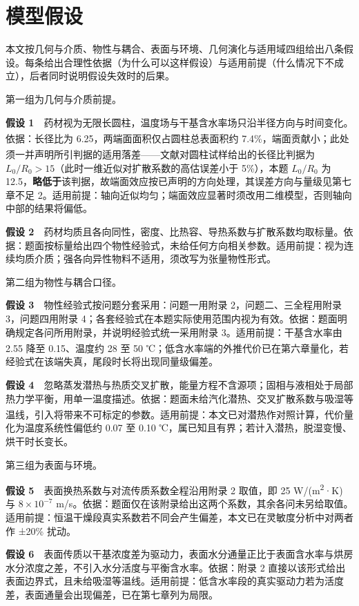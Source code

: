 \section{模型假设}
本文按几何与介质、物性与耦合、表面与环境、几何演化与适用域四组给出八条假设。每条给出合理性依据（为什么可以这样假设）与适用前提（什么情况下不成立），后者同时说明假设失效时的后果。

第一组为几何与介质前提。

\textbf{假设 1}　药材视为无限长圆柱，温度场与干基含水率场只沿半径方向与时间变化。依据：长径比为 6.25，两端面面积仅占圆柱总表面积约 7.4\%，端面贡献小\textsuperscript{\cite{ref14}}；此处须一并声明所引判据的适用落差——文献\textsuperscript{\cite{ref14}}对圆柱试样给出的长径比判据为 $L_0/R_0>15$（此时一维近似对扩散系数的高估误差小于 5\%），本题 $L_0/R_0$ 为 12.5，\textbf{略低于}该判据，故端面效应按已声明的方向处理，其误差方向与量级见第七章不足 2。适用前提：轴向近似均匀；端面效应显著时须改用二维模型，否则轴向中部的结果将偏低。

\textbf{假设 2}　药材均质且各向同性，密度、比热容、导热系数与扩散系数均取标量。依据：题面按标量给出四个物性经验式，未给任何方向相关参数。适用前提：视为连续均质介质；强各向异性物料不适用，须改写为张量物性形式。

第二组为物性与耦合口径。

\textbf{假设 3}　物性经验式按问题分套采用：问题一用附录 2，问题二、三全程用附录 3，问题四用附录 4；各套经验式在本题实际使用范围内视为有效。依据：题面明确规定各问所用附录，并说明经验式统一采用附录 3。适用前提：干基含水率由 2.55 降至 0.15、温度约 28 至 50 ℃；低含水率端的外推代价已在第六章量化\textsuperscript{\cite{ref5,ref6}}，若经验式在该端失真，尾段时长将出现同量级偏差。

\textbf{假设 4}　忽略蒸发潜热与热质交叉扩散，能量方程不含源项；固相与液相处于局部热力学平衡，用单一温度描述。依据：题面未给汽化潜热、交叉扩散系数与吸湿等温线，引入将带来不可标定的参数\textsuperscript{\cite{ref3}}。适用前提：本文已对潜热作对照计算，代价量化为温度系统性偏低约 0.07 至 0.10 ℃，属已知且有界；若计入潜热，脱湿变慢、烘干时长变长。

第三组为表面与环境。

\textbf{假设 5}　表面换热系数与对流传质系数全程沿用附录 2 取值，即 25 W/(m\textsuperscript{2}·K) 与 $8\times10^{-7}$ m/s。依据：题面仅在该附录给出这两个系数，其余各问未另给取值。适用前提：恒温干燥段真实系数若不同会产生偏差，本文已在灵敏度分析中对两者作 ±20\% 扰动。

\textbf{假设 6}　表面传质以干基浓度差为驱动力，表面水分通量正比于表面含水率与烘房水分浓度之差，不引入水分活度与平衡含水率。依据：附录 2 直接以该形式给出表面边界式，且未给吸湿等温线。适用前提：低含水率段的真实驱动力若为活度差，表面通量会出现偏差，已在第七章列为局限。


